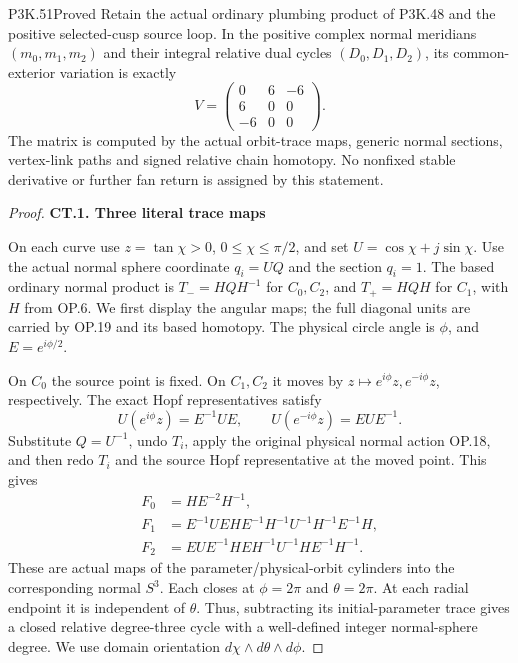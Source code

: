 \begin{statement}{P3K.51}{Proved}
Retain the actual ordinary plumbing product of P3K.48 and the
positive selected-cusp source loop. In the positive complex normal
meridians \((m_0,m_1,m_2)\) and their integral relative dual cycles
\((D_0,D_1,D_2)\), its common-exterior variation is exactly
\[
 V=\begin{pmatrix}0&6&-6\\6&0&0\\-6&0&0\end{pmatrix}.
\]
The matrix is computed by the actual orbit-trace maps, generic
normal sections, vertex-link paths and signed relative chain
homotopy. No nonfixed stable derivative or further fan return is
assigned by this statement.
\end{statement}
\begin{proof}
\par

\medskip\noindent\textbf{CT.1. Three literal trace maps}

\par\nobreak

On each curve use \(z=\tan\chi>0\), \(0\leq\chi\leq\pi/2\),
and set \(U=\cos\chi+j\sin\chi\). Use the actual normal sphere
coordinate \(q_i=UQ\) and the section \(q_i=1\). The based ordinary
normal product is \(T_-=HQH^{-1}\) for \(C_0,C_2\), and
\(T_+=HQH\) for \(C_1\), with \(H\) from OP.6. We first display
the angular maps; the full diagonal units are carried by OP.19 and
its based homotopy. The physical circle angle is \(\phi\), and
\(E=e^{i\phi/2}\).

On \(C_0\) the source point is fixed. On \(C_1,C_2\) it moves
by \(z\mapsto e^{i\phi}z,e^{-i\phi}z\), respectively. The exact
Hopf representatives satisfy
\[
 U(e^{i\phi}z)=E^{-1}UE,\qquad
 U(e^{-i\phi}z)=EUE^{-1}.                         \tag{CT.1}
\]
Substitute \(Q=U^{-1}\), undo \(T_i\), apply the original
physical normal action OP.18, and then redo \(T_i\) and the
source Hopf representative at the moved point. This gives
\[
 \begin{aligned}
 F_0&=H E^{-2}H^{-1},\\
 F_1&=E^{-1}UEH E^{-1}H^{-1}U^{-1}H^{-1}E^{-1}H,\\
 F_2&=EUE^{-1}H E H^{-1}U^{-1}H E^{-1}H^{-1}.
 \end{aligned}                                           \tag{CT.2}
\]
These are actual maps of the parameter/physical-orbit cylinders into
the corresponding normal \(S^3\). Each closes at \(\phi=2\pi\)
and \(\theta=2\pi\). At each radial endpoint it is independent
of \(\theta\). Thus, subtracting its initial-parameter trace gives
a closed relative degree-three cycle with a well-defined integer
normal-sphere degree. We use domain orientation
\(d\chi\wedge d\theta\wedge d\phi\).


\end{proof}
